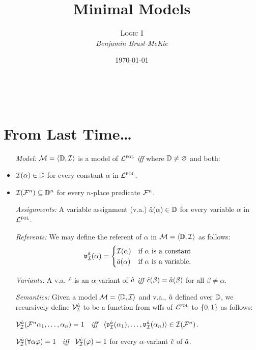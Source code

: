 \documentclass[a4paper, 11pt]{article} %
\title{\textbf{Minimal Models}} %
\author{\textsc{Logic I}\\ \em Benjamin Brast-McKie} %
\date{\today} %
\makeatletter
\renewcommand{\maketitle}{
\begin{flushright}
{\LARGE\@title}

\vspace{10pt}

{\@author}
\\ \@date
\end{flushright}

\vspace{-20pt}

}
\makeatother
\begin{document}
\maketitle %

\thispagestyle{empty}



\section*{From Last Time\ldots}

\begin{itemize}
  \item[\it Model:] $\mathcal{M}=\langle\mathbb{D},\mathcal{I}\rangle$ is a model of $\mathcal{L}^{\textsc{fol}}$ \textit{iff} where $\mathbb{D}\neq\varnothing$ and both:
    \item $\mathcal{I}(\alpha)\in\mathbb{D}$ for every constant $\alpha$ in $\mathcal{L}^{\textsc{fol}}$. 
    \item $\mathcal{I}(\mathcal{F}^n)\subseteq\mathbb{D}^n$ for every $n$-place predicate $\mathcal{F}^n$.
  \item[\it Assignments:] A variable assignment (v.a.) $\hat{a}(\alpha)\in\mathbb{D}$ for every variable $\alpha$ in $\mathcal{L}^{\textsc{fol}}$.
  \item[\it Referents:] We may define the referent of $\alpha$ in $\mathcal{M}=\langle\mathbb{D},\mathcal{I}\rangle$ as follows:
    \begin{align*}
      \mathfrak{v}_{\mathcal{I}}^{\hat{a}}{(\alpha)}=
        \begin{cases}
          \mathcal{I}(\alpha) & \text{if } \alpha \text{ is a constant} \\
          \hat{a}(\alpha) & \text{if } \alpha \text{ is a variable.}
        \end{cases}
    \end{align*}
  \item[\it Variants:] A v.a. $\hat{c}$ is an $\alpha$-variant of $\hat{a}$ \textit{iff} $\hat{c}(\beta)=\hat{a}(\beta)$ for all $\beta\neq\alpha$.
  \item[\it Semantics:] Given a model $\mathcal{M} = \langle\mathbb{D}, \mathcal{I}\rangle$ and v.a., $\hat{a}$ defined over $\mathbb{D}$, we recursively define $\mathcal{V}_{\mathcal{I}}^{\hat{a}}$ to be a function from wffs of $\mathcal{L}^{\textsc{fol}}$ to $\lbrace0,1\rbrace$ as follows: 
  \item[] $\mathcal{V}_{\mathcal{I}}^{\hat{a}}(\mathcal{F}^n\alpha_1,\ldots,\alpha_n)=1$ ~\textit{iff}~ $\langle\mathfrak{v}_{\mathcal{I}}^{\hat{a}}{(\alpha_1)},\ldots,\mathfrak{v}_{\mathcal{I}}^{\hat{a}}{(\alpha_n)}\rangle\in\mathcal{I}(\mathcal{F}^n)$.
  \item[] $\mathcal{V}_{\mathcal{I}}^{\hat{a}}(\forall\alpha\varphi)=1$ ~\textit{iff}~ $\mathcal{V}_{\mathcal{I}}^{\hat{c}}(\varphi)=1$ for every $\alpha$-variant $\hat{c}$ of $\hat{a}$.

\end{itemize}
\end{document}
